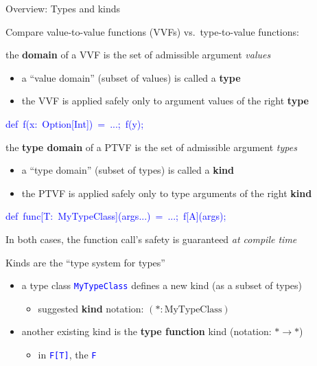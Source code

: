 \documentclass[english]{beamer}
\newenvironment{lyxcode}
   {\par\begin{list}{}{
     \setlength{\rightmargin}{\leftmargin}
     \setlength{\listparindent}{0pt}%
     \raggedright
     \setlength{\itemsep}{0pt}
     \setlength{\parsep}{0pt}
     \normalfont\ttfamily}%
    \def\{{\char`\{}
    \def\}{\char`\}}
    \def\textasciitilde{\char`\~}
    \item[]}
   {\end{list}}
\begin{document}
\begin{frame}{Overview: Types and kinds}

Compare value-to-value functions (VVFs) vs.\ type-to-value functions:
\begin{itemize}
\item the \textbf{domain} of a VVF is the set of admissible argument \emph{values}
\begin{itemize}
\item a ``value domain'' (subset of values) is called a \textbf{type}
\item the VVF is applied safely only to argument values of the right \textbf{type}
\end{itemize}
\begin{lyxcode}
\textcolor{blue}{\footnotesize{}def~f(x:~Option{[}Int{]})~=~...;~f(y);}{\footnotesize \par}
\end{lyxcode}
\item the \textbf{type domain} of a PTVF is the set of admissible argument
\emph{types}
\begin{itemize}
\item a ``type domain'' (subset of types) is called a \textbf{kind}
\item the PTVF is applied safely only to type arguments of the right \textbf{kind}
\end{itemize}
\begin{lyxcode}
\textcolor{blue}{\footnotesize{}def~func{[}T:~MyTypeClass{]}(args...)~=~...;~f{[}A{]}(args);}{\footnotesize \par}
\end{lyxcode}
\item In both cases, the function call's safety is guaranteed \emph{at compile
time}
\end{itemize}
Kinds are the ``type system for types''
\begin{itemize}
\item a type class \texttt{\textcolor{blue}{\footnotesize{}MyTypeClass}}
defines a new kind (as a subset of types)
\begin{itemize}
\item suggested \textbf{kind} notation:{\footnotesize{} $(*:\text{MyTypeClass})$}{\footnotesize \par}
\end{itemize}
\item another existing kind is the \textbf{type function} kind (notation:
$*\rightarrow*$)
\begin{itemize}
\item in \texttt{\textcolor{blue}{\footnotesize{}F{[}T{]}}}, the \texttt{\textcolor{blue}{\footnotesize{}F}}

\end{itemize}
\end{itemize}
\end{frame}
\end{document}

